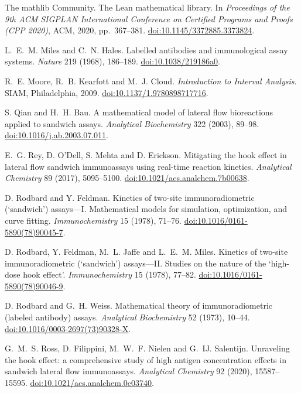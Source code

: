  The mathlib Community.
The Lean mathematical library.
In \emph{Proceedings of the 9th ACM SIGPLAN International Conference on Certified Programs and Proofs (CPP 2020)}, ACM, 2020, pp.~367--381.
\href{https://doi.org/10.1145/3372885.3373824}{doi:10.1145/3372885.3373824}.

 L.~E.~M. Miles and C.~N. Hales.
Labelled antibodies and immunological assay systems.
\emph{Nature} 219 (1968), 186--189.
\href{https://doi.org/10.1038/219186a0}{doi:10.1038/219186a0}.

 R.~E. Moore, R.~B. Kearfott and M.~J. Cloud.
\emph{Introduction to Interval Analysis}.
SIAM, Philadelphia, 2009.
\href{https://doi.org/10.1137/1.9780898717716}{doi:10.1137/1.9780898717716}.

 S. Qian and H.~H. Bau.
A mathematical model of lateral flow bioreactions applied to sandwich assays.
\emph{Analytical Biochemistry} 322 (2003), 89--98.
\href{https://doi.org/10.1016/j.ab.2003.07.011}{doi:10.1016/j.ab.2003.07.011}.

 E.~G. Rey, D. O'Dell, S. Mehta and D. Erickson.
Mitigating the hook effect in lateral flow sandwich immunoassays using real-time reaction kinetics.
\emph{Analytical Chemistry} 89 (2017), 5095--5100.
\href{https://doi.org/10.1021/acs.analchem.7b00638}{doi:10.1021/acs.analchem.7b00638}.

 D. Rodbard and Y. Feldman.
Kinetics of two-site immunoradiometric (`sandwich') assays---I. Mathematical models for simulation, optimization, and curve fitting.
\emph{Immunochemistry} 15 (1978), 71--76.
\href{https://doi.org/10.1016/0161-5890(78)90045-7}{doi:10.1016/0161-5890(78)90045-7}.

 D. Rodbard, Y. Feldman, M.~L. Jaffe and L.~E.~M. Miles.
Kinetics of two-site immunoradiometric (`sandwich') assays---II. Studies on the nature of the `high-dose hook effect'.
\emph{Immunochemistry} 15 (1978), 77--82.
\href{https://doi.org/10.1016/0161-5890(78)90046-9}{doi:10.1016/0161-5890(78)90046-9}.

 D. Rodbard and G.~H. Weiss.
Mathematical theory of immunoradiometric (labeled antibody) assays.
\emph{Analytical Biochemistry} 52 (1973), 10--44.
\href{https://doi.org/10.1016/0003-2697(73)90328-X}{doi:10.1016/0003-2697(73)90328-X}.

 G.~M.~S. Ross, D. Filippini, M.~W.~F. Nielen and G.~IJ. Salentijn.
Unraveling the hook effect: a comprehensive study of high antigen concentration effects in sandwich lateral flow immunoassays.
\emph{Analytical Chemistry} 92 (2020), 15587--15595.
\href{https://doi.org/10.1021/acs.analchem.0c03740}{doi:10.1021/acs.analchem.0c03740}.

